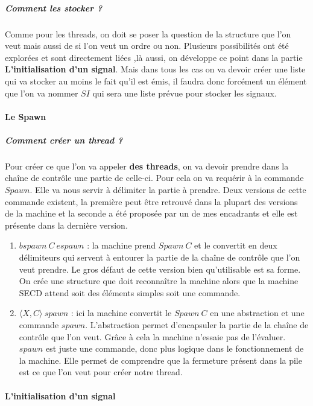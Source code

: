 \documentclass[10pt,a4paper]{report}
\begin{document}
\subparagraph{Comment les stocker ?}
Comme pour les threads, on doit se poser la question de la structure que l'on veut mais aussi de si l'on veut un ordre ou non. Plusieurs possibilités ont été explorées et sont directement liées ,là aussi, on développe ce point dans la partie \textbf{L'initialisation d'un signal}. Mais dans tous les cas on va devoir créer une liste qui va stocker au moins le fait qu'il est émis, il faudra donc forcément un élément que l'on va nommer $SI$ qui sera une liste prévue pour stocker les signaux.
\bigbreak 


\paragraph{Le Spawn} 

\subparagraph{Comment créer un thread ?}
Pour créer ce que l'on va appeler \textbf{des threads}, on va devoir prendre dans la chaîne de contrôle une partie de celle-ci. Pour cela on va requérir à la commande $Spawn$. Elle va nous servir à délimiter la partie à prendre. Deux versions de cette commande existent, la première peut être retrouvé dans la plupart des versions de la machine et la seconde a été proposée par un de mes encadrants et elle est présente dans la dernière version.
\smallbreak
\begin{enumerate}
\item $bspawn~C~espawn$ : la machine prend $Spawn~C$ et le convertit en deux délimiteurs qui servent à entourer la partie de la chaîne de contrôle que l'on veut prendre. Le gros défaut de cette version bien qu'utilisable est sa forme. On crée une structure que doit reconnaître la machine alors que la machine SECD attend soit des éléments simples soit une commande.
\item $\langle X,C\rangle~spawn$ : ici la machine convertit le $Spawn~C$ en une abstraction et une commande $spawn$. L'abstraction permet d'encapsuler la partie de la chaîne de contrôle que l'on veut. Grâce à cela la machine n'essaie pas de l'évaluer. $spawn$ est juste une commande, donc plus logique dans le fonctionnement de la machine. Elle permet de comprendre que la fermeture présent dans la pile est ce que l'on veut pour créer notre thread. 
\end{enumerate}
\medbreak



\paragraph{L'initialisation d'un signal}
\end{document}
